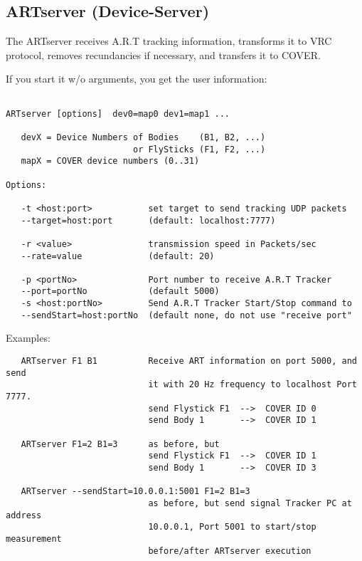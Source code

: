 \subsection{ARTserver (Device-Server)}

The ARTserver receives A.R.T tracking information, transforms it to VRC protocol, removes recundancies if
necessary, and transfers it to COVER.

If you start it w/o arguments, you get the user information:


\small \begin{verbatim}

ARTserver [options]  dev0=map0 dev1=map1 ...

   devX = Device Numbers of Bodies    (B1, B2, ...)
                         or FlySticks (F1, F2, ...)
   mapX = COVER device numbers (0..31)

Options:

   -t <host:port>           set target to send tracking UDP packets
   --target=host:port       (default: localhost:7777)

   -r <value>               transmission speed in Packets/sec
   --rate=value             (default: 20)

   -p <portNo>              Port number to receive A.R.T Tracker
   --port=portNo            (default 5000)
   -s <host:portNo>         Send A.R.T Tracker Start/Stop command to
   --sendStart=host:portNo  (default none, do not use "receive port"

\end{verbatim} \normalsize

Examples:


\small \begin{verbatim}
   ARTserver F1 B1          Receive ART information on port 5000, and send
                            it with 20 Hz frequency to localhost Port 7777.
                            send Flystick F1  -->  COVER ID 0
                            send Body 1       -->  COVER ID 1

   ARTserver F1=2 B1=3      as before, but
                            send Flystick F1  -->  COVER ID 1
                            send Body 1       -->  COVER ID 3

   ARTserver --sendStart=10.0.0.1:5001 F1=2 B1=3
                            as before, but send signal Tracker PC at address
                            10.0.0.1, Port 5001 to start/stop measurement 
                            before/after ARTserver execution
\end{verbatim} \normalsize
    


